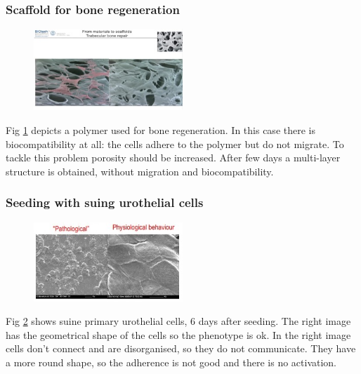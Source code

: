         \subsubsection{Scaffold for bone regeneration}

        \begin{figure}[h]
            \centering
            \includegraphics[width=0.5\textwidth]{bone.jpg}
            \caption{\label{fig:bone}}
        \end{figure}

        Fig \ref{fig:bone} depicts a polymer used for bone regeneration.
        In this case there is biocompatibility at all: the cells adhere to the polymer but do not migrate.
        To tackle this problem porosity should be increased.
        After few days a multi-layer structure is obtained, without migration and biocompatibility.

        \subsubsection{Seeding with suing urothelial cells}

        \begin{figure}[h]
            \centering
            \includegraphics[width=0.5\textwidth]{suine.jpg}
            \caption{\label{fig:suine}}
        \end{figure}

        Fig \ref{fig:suine} shows suine primary urothelial cells, 6 days after seeding.
        The right image has the geometrical shape of the cells so the phenotype is ok.
        In the right image cells don’t connect and are disorganised, so they do not communicate.
        They have a more round shape, so the adherence is not good and there is no activation.


